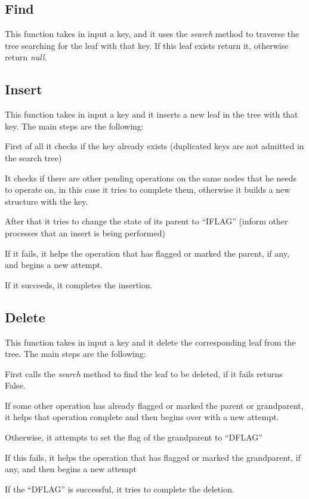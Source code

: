 \documentclass[a4paper]{article}
\begin{document}
\subsection{Find}
This function takes in input a key, and it uses the \emph{search} method to traverse the tree searching for the leaf with that key. If this leaf exists return it, otherwise return \emph{null}.

\subsection{Insert}
This function takes in input a key and it inserts a new leaf in the tree with that key. The main steps are the following:
\begin{compactitem}
  \item First of all it checks if the key already exists (duplicated keys are not admitted in the search tree)
  \item It checks if there are other pending operations on the same nodes that he needs to operate on, in this case it tries to complete them, otherwise it builds a new structure with the key. 
  \item After that it tries to change the state of its parent to ``IFLAG'' (inform other processes that an insert is being performed)
  \begin{compactitem}
    \item If it fails, it helps the operation that has flagged or marked the parent, if any, and begins a new attempt.
    \item If it succeeds, it completes the insertion.
  \end{compactitem}
\end{compactitem}

\subsection{Delete}
This function takes in input a key and it delete the corresponding leaf from the tree. The main steps are the following:
\begin{compactitem}
  \item First calls the \emph{search} method to find the leaf to be deleted, if it fails returns False.
  \item If some other operation has already flagged or marked the parent or grandparent, it helps that operation complete and then begins over with a new attempt.
  \item Otherwise, it attempts to set the flag of the grandparent to ``DFLAG'' 
    \begin{compactitem}
      \item If this fails, it helps the operation that has flagged or marked the grandparent, if any, and then begins a new attempt
      \item If the ``DFLAG'' is successful, it tries to complete the deletion.
    \end{compactitem}
\end{compactitem}
\end{document}
